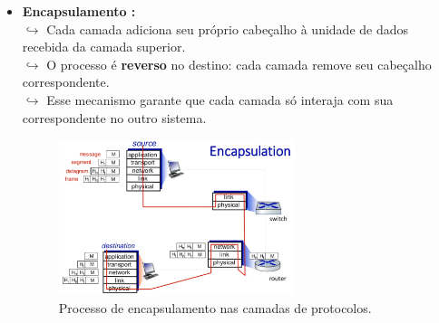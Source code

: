 \begin{itemize}
        \item \textbf{Encapsulamento :} \\
            $\hookrightarrow$ Cada camada adiciona seu próprio cabeçalho à unidade de dados recebida da camada superior. \\
            $\hookrightarrow$ O processo é \textbf{reverso} no destino: cada camada remove seu cabeçalho correspondente. \\
            $\hookrightarrow$ Esse mecanismo garante que cada camada só interaja com sua correspondente no outro sistema.
        
        \begin{figure}[H]
            \centering
            \includegraphics[width=0.65\textwidth]{img/cap-01/encapsulamento.png}
            \caption{Processo de encapsulamento nas camadas de protocolos.}
        \end{figure}
    \end{itemize}
